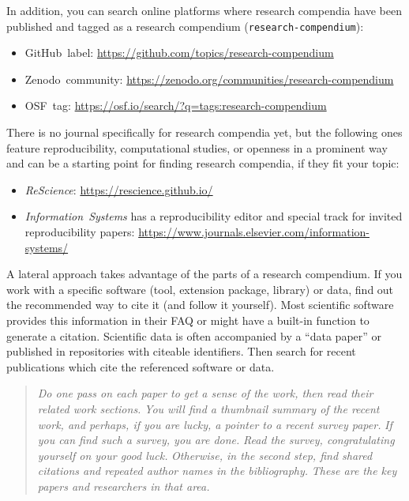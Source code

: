\documentclass[twocolumn]{article}
\providecommand{\tightlist}{%
  \setlength{\itemsep}{0pt}\setlength{\parskip}{0pt}}
\begin{document}
In addition, you can search online platforms where research compendia
have been published and tagged as a research compendium
(\texttt{research-compendium}):

\begin{itemize}
\tightlist
\item
  GitHub~label: \url{https://github.com/topics/research-compendium}
\item
  Zenodo~community:
  \url{https://zenodo.org/communities/research-compendium}
\item
  OSF~tag: \url{https://osf.io/search/?q=tags:research-compendium}
\end{itemize}

There is no journal specifically for research compendia yet, but the
following ones feature reproducibility, computational studies, or
openness in a prominent way and can be a starting point for finding
research compendia, if they fit your topic:

\begin{itemize}
\tightlist
\item
  \emph{ReScience}: \url{https://rescience.github.io/}
\item
  \emph{Information~Systems} has a reproducibility editor and special
  track for invited reproducibility papers:
  \url{https://www.journals.elsevier.com/information-systems/}
\end{itemize}

A lateral approach takes advantage of the parts of a research
compendium. If you work with a specific software (tool, extension
package, library) or data, find out the recommended way to cite it (and
follow it yourself). Most scientific software provides this information
in their FAQ or might have a built-in function to generate a citation.
Scientific data is often accompanied by a ``data paper'' or published in
repositories with citeable identifiers. Then search for recent
publications which cite the referenced software or data.

\begin{quote}
\emph{Do one pass on each paper to get a sense of the work, then read
their related work sections.} \emph{You will find a thumbnail summary of
the recent work, and perhaps, if you are lucky, a pointer to a recent
survey paper.} \emph{If you can find such a survey, you are done.}
\emph{Read the survey, congratulating yourself on your good luck.}
\emph{Otherwise, in the second step, find shared citations and repeated
author names in the bibliography.} \emph{These are the key papers and
researchers in that area.}
\end{quote}
\end{document}
